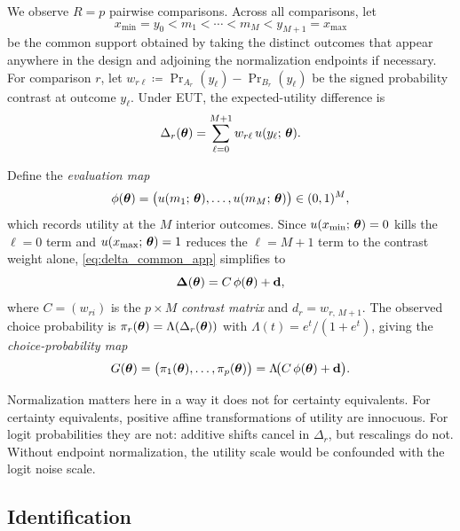 We observe $R = p$ pairwise comparisons. Across all comparisons, let
\begin{equation}
  x_{\min} = y_0 < m_1 < \cdots < m_M < y_{M+1} = x_{\max}
\end{equation}
be the common support obtained by taking the distinct outcomes that
appear anywhere in the design and adjoining the normalization
endpoints if necessary. For comparison $r$, let
$w_{r\ell} \coloneqq \Pr_{A_r}(y_\ell) - \Pr_{B_r}(y_\ell)$ be the
signed probability contrast at outcome $y_\ell$. Under EUT, the
expected-utility difference is
\begin{equation}\label{eq:delta_common_app}
  \Delta_r(\boldsymbol{\theta})
  =
  \sum_{\ell=0}^{M+1} w_{r\ell}\,u(y_\ell;\,\boldsymbol{\theta}).
\end{equation}

Define the \textit{evaluation map}
\begin{equation}\label{eq:phi_def_app}
  \phi(\boldsymbol{\theta})
  =
  \bigl(u(m_1;\,\boldsymbol{\theta}), \ldots,
        u(m_M;\,\boldsymbol{\theta})\bigr)
  \in (0,1)^M,
\end{equation}
which records utility at the $M$ interior outcomes. Since
$u(x_{\min};\,\boldsymbol{\theta}) = 0$ kills the $\ell = 0$ term and
$u(x_{\max};\,\boldsymbol{\theta}) = 1$ reduces the $\ell = M{+}1$ term
to the contrast weight alone, \eqref{eq:delta_common_app} simplifies to
\begin{equation}\label{eq:Delta_linear_app}
  \boldsymbol{\Delta}(\boldsymbol{\theta})
  =
  C\,\phi(\boldsymbol{\theta}) + \mathbf{d},
\end{equation}
where $C = (w_{ri})$ is the $p \times M$ \textit{contrast matrix} and
$d_r = w_{r,\,M+1}$. The observed choice probability is
$\pi_r(\boldsymbol{\theta}) = \Lambda(\Delta_r(\boldsymbol{\theta}))$
with $\Lambda(t) = e^t/(1+e^t)$, giving the
\textit{choice-probability map}
\begin{equation}\label{eq:factorization_app}
  G(\boldsymbol{\theta})
  =
  \bigl(\pi_1(\boldsymbol{\theta}), \ldots,
        \pi_p(\boldsymbol{\theta})\bigr)
  =
  \Lambda\!\bigl(C\,\phi(\boldsymbol{\theta}) + \mathbf{d}\bigr).
\end{equation}

Normalization matters here in a way it does not for certainty
equivalents. For certainty equivalents, positive affine transformations
of utility are innocuous. For logit probabilities they are not: additive
shifts cancel in $\Delta_r$, but rescalings do not. Without endpoint
normalization, the utility scale would be confounded with the logit noise
scale.


\subsection{Identification}


